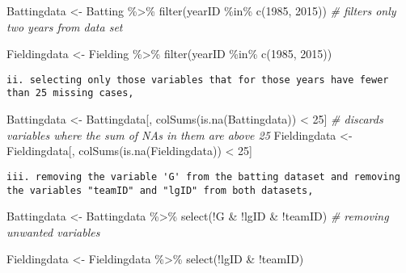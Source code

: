 \documentclass[
]{article}
\newenvironment{Shaded}{\begin{snugshade}}{\end{snugshade}}
\newcommand{\CommentTok}[1]{\textcolor[rgb]{0.56,0.35,0.01}{\textit{#1}}}
\newcommand{\DecValTok}[1]{\textcolor[rgb]{0.00,0.00,0.81}{#1}}
\newcommand{\FunctionTok}[1]{\textcolor[rgb]{0.00,0.00,0.00}{#1}}
\newcommand{\NormalTok}[1]{#1}
\newcommand{\OtherTok}[1]{\textcolor[rgb]{0.56,0.35,0.01}{#1}}
\newcommand{\SpecialCharTok}[1]{\textcolor[rgb]{0.00,0.00,0.00}{#1}}
\begin{document}
\begin{Shaded}
\begin{Highlighting}[]
\NormalTok{Battingdata }\OtherTok{\textless{}{-}}\NormalTok{ Batting }\SpecialCharTok{\%\textgreater{}\%}
  \FunctionTok{filter}\NormalTok{(yearID }\SpecialCharTok{\%in\%} \FunctionTok{c}\NormalTok{(}\DecValTok{1985}\NormalTok{, }\DecValTok{2015}\NormalTok{)) }\CommentTok{\# filters only two years from data set}

\NormalTok{Fieldingdata }\OtherTok{\textless{}{-}}\NormalTok{ Fielding }\SpecialCharTok{\%\textgreater{}\%}
  \FunctionTok{filter}\NormalTok{(yearID }\SpecialCharTok{\%in\%} \FunctionTok{c}\NormalTok{(}\DecValTok{1985}\NormalTok{, }\DecValTok{2015}\NormalTok{))}
\end{Highlighting}
\end{Shaded}

\begin{verbatim}
ii. selecting only those variables that for those years have fewer than 25 missing cases, 
\end{verbatim}

\begin{Shaded}
\begin{Highlighting}[]
\NormalTok{Battingdata }\OtherTok{\textless{}{-}}\NormalTok{ Battingdata[, }\FunctionTok{colSums}\NormalTok{(}\FunctionTok{is.na}\NormalTok{(Battingdata)) }\SpecialCharTok{\textless{}} \DecValTok{25}\NormalTok{] }\CommentTok{\# discards variables where the sum of NAs in them are above 25}
\NormalTok{Fieldingdata }\OtherTok{\textless{}{-}}\NormalTok{ Fieldingdata[, }\FunctionTok{colSums}\NormalTok{(}\FunctionTok{is.na}\NormalTok{(Fieldingdata)) }\SpecialCharTok{\textless{}} \DecValTok{25}\NormalTok{]}
\end{Highlighting}
\end{Shaded}

\begin{verbatim}
iii. removing the variable 'G' from the batting dataset and removing the variables "teamID" and "lgID" from both datasets, 
\end{verbatim}

\begin{Shaded}
\begin{Highlighting}[]
\NormalTok{Battingdata }\OtherTok{\textless{}{-}}\NormalTok{ Battingdata }\SpecialCharTok{\%\textgreater{}\%}
  \FunctionTok{select}\NormalTok{(}\SpecialCharTok{!}\NormalTok{G }\SpecialCharTok{\&} \SpecialCharTok{!}\NormalTok{lgID }\SpecialCharTok{\&} \SpecialCharTok{!}\NormalTok{teamID) }\CommentTok{\# removing unwanted variables}

\NormalTok{Fieldingdata }\OtherTok{\textless{}{-}}\NormalTok{ Fieldingdata }\SpecialCharTok{\%\textgreater{}\%}
  \FunctionTok{select}\NormalTok{(}\SpecialCharTok{!}\NormalTok{lgID }\SpecialCharTok{\&} \SpecialCharTok{!}\NormalTok{teamID)}
\end{Highlighting}
\end{Shaded}
\end{document}
